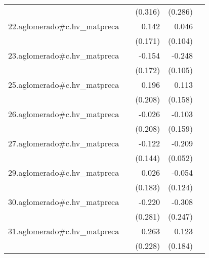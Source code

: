 {\begin{longtable}{l*{4}{D{.}{.}{-1}}}
            &                     &     (0.316)         &     (0.286)         &                     \\
\addlinespace
22.aglomerado#c.hv\_matpreca&                     &       0.142         &       0.046         &                     \\
            &                     &     (0.171)         &     (0.104)         &                     \\
\addlinespace
23.aglomerado#c.hv\_matpreca&                     &      -0.154         &      -0.248\sym{*}  &                     \\
            &                     &     (0.172)         &     (0.105)         &                     \\
\addlinespace
25.aglomerado#c.hv\_matpreca&                     &       0.196         &       0.113         &                     \\
            &                     &     (0.208)         &     (0.158)         &                     \\
\addlinespace
26.aglomerado#c.hv\_matpreca&                     &      -0.026         &      -0.103         &                     \\
            &                     &     (0.208)         &     (0.159)         &                     \\
\addlinespace
27.aglomerado#c.hv\_matpreca&                     &      -0.122         &      -0.209\sym{***}&                     \\
            &                     &     (0.144)         &     (0.052)         &                     \\
\addlinespace
29.aglomerado#c.hv\_matpreca&                     &       0.026         &      -0.054         &                     \\
            &                     &     (0.183)         &     (0.124)         &                     \\
\addlinespace
30.aglomerado#c.hv\_matpreca&                     &      -0.220         &      -0.308         &                     \\
            &                     &     (0.281)         &     (0.247)         &                     \\
\addlinespace
31.aglomerado#c.hv\_matpreca&                     &       0.263         &       0.123         &                     \\
            &                     &     (0.228)         &     (0.184)         &                     \\

\end{longtable}}
